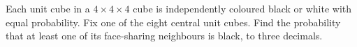 Each unit cube in a $4\times4\times4$ cube is independently coloured black or white with equal probability. Fix one of the eight central unit cubes. Find the probability that at least one of its face-sharing neighbours is black, to three decimals.
